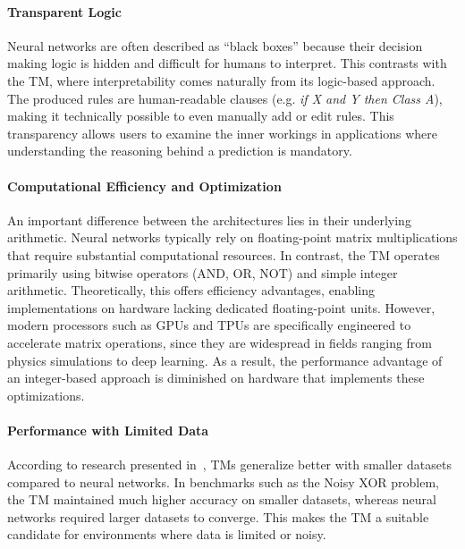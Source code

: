 \documentclass[english]{aghengthesis} %
\begin{document}
\paragraph{Transparent Logic}
Neural networks are often described as ``black boxes'' because their decision making logic is hidden and difficult for humans to interpret. This contrasts with the TM, where interpretability comes naturally from its logic-based approach. The produced rules are human-readable clauses (e.g. \textit{if X and Y then Class A}), making it technically possible to even manually add or edit rules. This transparency allows users to examine the inner workings in applications where understanding the reasoning behind a prediction is mandatory.

\paragraph{Computational Efficiency and Optimization}
An important difference between the architectures lies in their underlying arithmetic. Neural networks typically rely on floating-point matrix multiplications that require substantial computational resources. In contrast, the TM operates primarily using bitwise operators (AND, OR, NOT) and simple integer arithmetic. Theoretically, this offers efficiency advantages, enabling implementations on hardware lacking dedicated floating-point units. However, modern processors such as GPUs and TPUs are specifically engineered to accelerate matrix operations, since they are widespread in fields ranging from physics simulations to deep learning. As a result, the performance advantage of an integer-based approach is diminished on hardware that implements these optimizations.

\paragraph{Performance with Limited Data}
According to research presented in~\cite{granmo2021tsetlinmachinegame}, TMs generalize better with smaller datasets compared to neural networks. In benchmarks such as the Noisy XOR problem, the TM maintained much higher accuracy on smaller datasets, whereas neural networks required larger datasets to converge. This makes the TM a suitable candidate for environments where data is limited or noisy.
\end{document}
